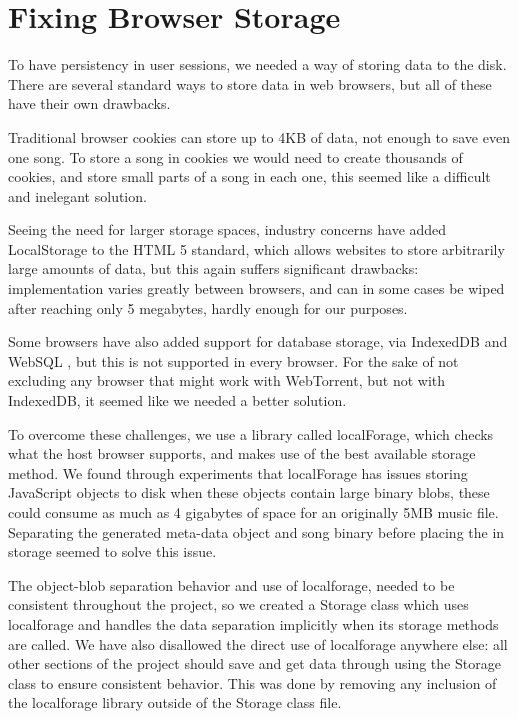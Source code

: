\section{Fixing Browser Storage}
To have persistency in user sessions, we needed a way of storing data to the disk. There are several standard ways to store data in web browsers, but all of these have their own drawbacks.

Traditional browser cookies can store up to 4KB of data, 
not enough to save even one song. 
To store a song in cookies we would need to create thousands of cookies, 
and store small parts of a song in each one, 
this seemed like a difficult and inelegant solution.

Seeing the need for larger storage spaces, 
industry concerns have added LocalStorage to the \acs{HTML} 5 standard,
which allows websites to store arbitrarily large amounts of data,
but this again suffers significant drawbacks: 
implementation varies greatly between browsers, 
and can in some cases be wiped after reaching only 5 megabytes, 
hardly enough for our purposes.

Some browsers have also added support for database storage, via IndexedDB and WebSQL \citep{WebSQL}, 
but this is not supported in every browser. 
For the sake of not excluding any browser that might work with WebTorrent, but not with IndexedDB,
it seemed like we needed a better solution.
\newline

To overcome these challenges, we use a library called localForage, 
which checks what the host browser supports,
and makes use of the best available storage method.
We found through experiments
that localForage has issues storing JavaScript objects to disk when these objects contain large binary blobs, 
these could consume as much as 4 gigabytes of space for an originally 5MB music file.
Separating the generated meta-data object and song binary before placing the in storage
seemed to solve this issue.
\newline

The object-blob separation behavior and use of localforage,
needed to be consistent throughout the project, 
so we created a Storage class which uses localforage and handles the data separation implicitly when its storage methods are called.
We have also disallowed the direct use of localforage anywhere else:
all other sections of the project should save and get data through using the Storage class to ensure consistent behavior. 
This was done by removing any inclusion of the localforage library outside of the Storage class file.

